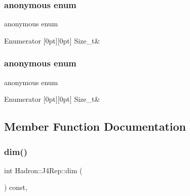 \subsubsection{\texorpdfstring{anonymous enum}{anonymous enum}}
{\footnotesize\ttfamily anonymous enum}

\begin{DoxyEnumFields}{Enumerator}
[0pt][0pt]{}\mbox{\label{structHadron_1_1J4Rep_ae15fa44ea367f60b5495d4dcdda1a8efa35f16a8e2fdabda918054d6b9eeedac6}} 
Size\+\_\+t&\\
\hline

\end{DoxyEnumFields}
\mbox{\label{structHadron_1_1J4Rep_ae15fa44ea367f60b5495d4dcdda1a8ef}} 
\subsubsection{\texorpdfstring{anonymous enum}{anonymous enum}}
{\footnotesize\ttfamily anonymous enum}

\begin{DoxyEnumFields}{Enumerator}
[0pt][0pt]{}\mbox{\label{structHadron_1_1J4Rep_ae15fa44ea367f60b5495d4dcdda1a8efa35f16a8e2fdabda918054d6b9eeedac6}} 
Size\+\_\+t&\\
\hline

\end{DoxyEnumFields}


\subsection{Member Function Documentation}
\mbox{\label{structHadron_1_1J4Rep_abd7390e1c86d4543ad991a7167f46615}} 
\subsubsection{\texorpdfstring{dim()}{dim()}\hspace{0.1cm}{\footnotesize\ttfamily [1/3]}}
{\footnotesize\ttfamily int Hadron\+::\+J4\+Rep\+::dim (\begin{DoxyParamCaption}{ }\end{DoxyParamCaption}) const\hspace{0.3cm}{\ttfamily [inline]}, {\ttfamily [virtual]}}



